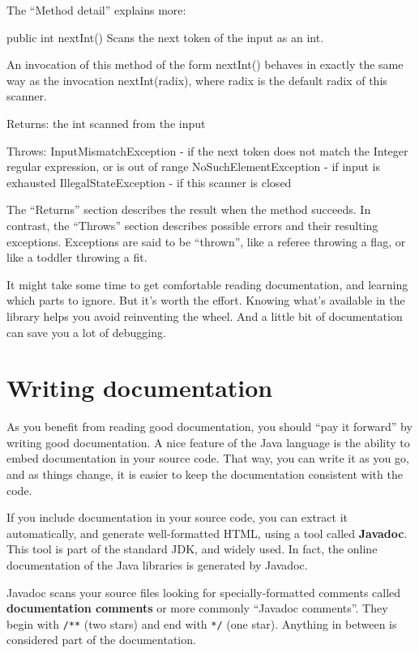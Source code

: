 \documentclass[12pt]{book}
\theoremstyle{exercise}
\newcommand{\java}[1]{\verb"#1"}
\begin{document}
The ``Method detail'' explains more:

\begin{stdout}
public int nextInt()
Scans the next token of the input as an int.

An invocation of this method of the form nextInt() behaves in
exactly the same way as the invocation nextInt(radix), where
radix is the default radix of this scanner.

Returns:
the int scanned from the input

Throws:
InputMismatchException - if the next token does not match
    the Integer regular expression, or is out of range
NoSuchElementException - if input is exhausted
IllegalStateException - if this scanner is closed
\end{stdout}

The ``Returns'' section describes the result when the method succeeds.
In contrast, the ``Throws'' section describes possible errors and their resulting exceptions.
Exceptions are said to be ``thrown'', like a referee throwing a flag, or like a toddler throwing a fit.

It might take some time to get comfortable reading documentation, and learning which parts to ignore.
But it's worth the effort.
Knowing what's available in the library helps you avoid reinventing the wheel.
And a little bit of documentation can save you a lot of debugging.


\section{Writing documentation}


As you benefit from reading good documentation, you should ``pay it forward'' by writing good documentation.
A nice feature of the Java language is the ability to embed documentation in your source code.
That way, you can write it as you go, and as things change, it is easier to keep the documentation consistent with the code.

If you include documentation in your source code, you can extract it automatically, and generate well-formatted HTML, using a tool called {\bf Javadoc}.
This tool is part of the standard JDK, and widely used.
In fact, the online documentation of the Java libraries is generated by Javadoc.


Javadoc scans your source files looking for specially-formatted comments called {\bf documentation comments} or more commonly ``Javadoc comments''.
They begin with \java{/**} (two stars) and end with \java{*/} (one star).
Anything in between is considered part of the documentation.
\end{document}
